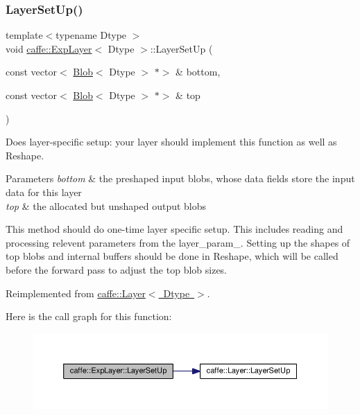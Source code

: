 \subsubsection{\texorpdfstring{Layer\+Set\+Up()}{LayerSetUp()}\hspace{0.1cm}{\footnotesize\ttfamily [1/2]}}
{\footnotesize\ttfamily template$<$typename Dtype $>$ \\
void \mbox{\hyperlink{classcaffe_1_1_exp_layer}{caffe\+::\+Exp\+Layer}}$<$ Dtype $>$\+::Layer\+Set\+Up (\begin{DoxyParamCaption}\item[{const vector$<$ \mbox{\hyperlink{classcaffe_1_1_blob}{Blob}}$<$ Dtype $>$ $\ast$$>$ \&}]{bottom,  }\item[{const vector$<$ \mbox{\hyperlink{classcaffe_1_1_blob}{Blob}}$<$ Dtype $>$ $\ast$$>$ \&}]{top }\end{DoxyParamCaption})\hspace{0.3cm}{\ttfamily [virtual]}}



Does layer-\/specific setup\+: your layer should implement this function as well as Reshape. 


\begin{DoxyParams}{Parameters}
{\em bottom} & the preshaped input blobs, whose data fields store the input data for this layer \\
\hline
{\em top} & the allocated but unshaped output blobs\\
\hline
\end{DoxyParams}
This method should do one-\/time layer specific setup. This includes reading and processing relevent parameters from the {\ttfamily layer\+\_\+param\+\_\+}. Setting up the shapes of top blobs and internal buffers should be done in {\ttfamily Reshape}, which will be called before the forward pass to adjust the top blob sizes. 

Reimplemented from \mbox{\hyperlink{classcaffe_1_1_layer_a481323a3e0972c682787f2137468c29f}{caffe\+::\+Layer$<$ Dtype $>$}}.

Here is the call graph for this function\+:
\nopagebreak
\begin{figure}[H]
\begin{center}
\leavevmode
\includegraphics[width=350pt]{classcaffe_1_1_exp_layer_a45ec267bdfd48e8aa34490e146405b9e_cgraph}
\end{center}
\end{figure}
\mbox{\label{classcaffe_1_1_exp_layer_ad482cfebeedd32e7b7d146106ece981a}} 

